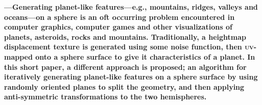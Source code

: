 \noindent
\textbf{%
%
  ---Generating planet-like features---e.g., mountains, ridges, valleys
  and oceans---on a sphere is an oft occurring problem encountered in computer graphics, computer
  games and other visualizations of planets, asteroids, rocks and mountains.  Traditionally, a
  heightmap displacement texture is generated using some noise function, then \textsc{uv}-mapped
  onto a sphere surface to give it characteristics of a planet.  In this short paper, a different
  approach is proposed; an algorithm for iteratively generating planet-like features on a sphere
  surface by using randomly oriented planes to split the geometry, and then applying anti-symmetric
  transformations to the two hemispheres.}
